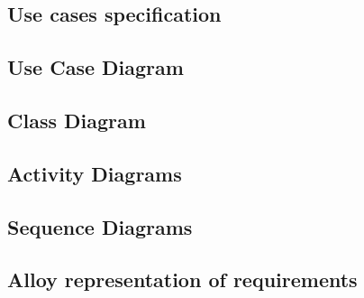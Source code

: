 \subsection{Use cases specification}

\subsection{Use Case Diagram}
\subsection{Class Diagram}
\subsection{Activity Diagrams}
\subsection{Sequence Diagrams}
\subsection{Alloy representation of requirements}

\clearpage
